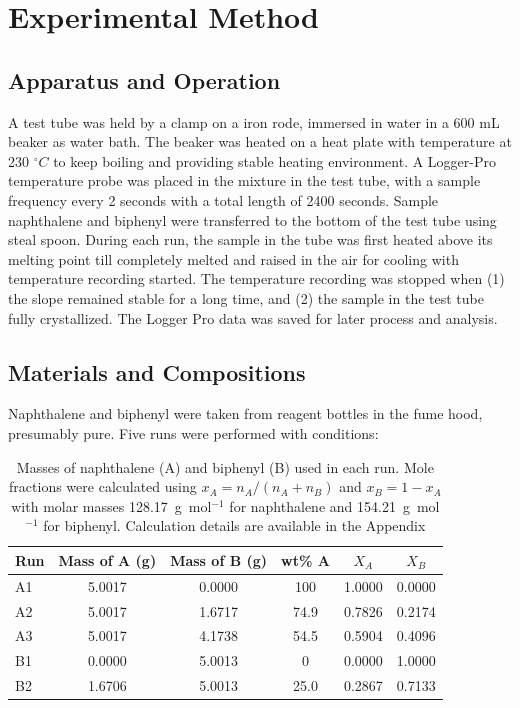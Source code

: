 \documentclass[12pt]{article}
\begin{document}
\section*{Experimental Method}

\subsection*{Apparatus and Operation}

A test tube was held by a clamp on a iron rode, immersed in water in a 600 mL beaker as water bath. The beaker was heated on a heat plate with temperature at 230 $^\circ C$ to keep boiling and providing stable heating environment. A Logger-Pro temperature probe was placed in the mixture in the test tube, with a sample frequency every 2 seconds with a total length of 2400 seconds. Sample naphthalene and biphenyl were transferred to the bottom of the test tube using steal spoon. During each run, the sample in the tube was first heated above its melting point till completely melted and raised in the air for cooling with temperature recording started. The temperature recording was stopped when (1) the slope remained stable for a long time, and (2) the sample in the test tube fully crystallized. The Logger Pro data was saved for later process and analysis.

\subsection*{Materials and Compositions}

Naphthalene and biphenyl were taken from reagent bottles in the fume hood, presumably pure. Five runs were performed with conditions:

\begin{table}[h]
\centering
\begin{tabular}{@{}lccccc@{}}
\toprule
Run & Mass of A (g) & Mass of B (g) & wt\% A & $X_A$ & $X_B$\\ \midrule
A1 & 5.0017 & 0.0000 & 100 & 1.0000 & 0.0000 \\ 
A2 & 5.0017 & 1.6717 & 74.9 & 0.7826 & 0.2174 \\ 
A3 & 5.0017 & 4.1738 & 54.5 & 0.5904 & 0.4096 \\ 
B1 & 0.0000 & 5.0013 & 0 & 0.0000 & 1.0000 \\ 
B2 & 1.6706 & 5.0013 & 25.0 & 0.2867 & 0.7133\\ \bottomrule
\end{tabular}
\caption{Masses of naphthalene (A) and biphenyl (B) used in each run.  Mole fractions were calculated using $x_A = n_A/(n_A+n_B)$ and $x_B=1-x_A$ with molar masses 128.17~g~mol$^{-1}$ for naphthalene and 154.21~g~mol$^{-1}$ for biphenyl. Calculation details are available in the Appendix}
\label{tab:composition}
\end{table}
\end{document}
